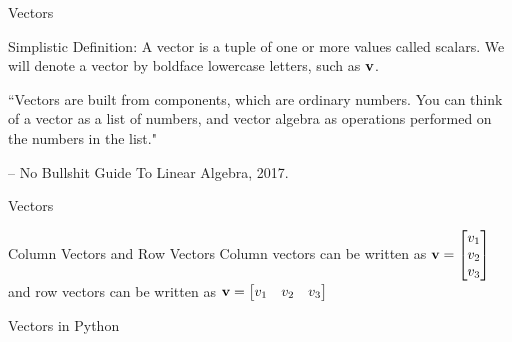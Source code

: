 \documentclass[aspectratio=169,xcolor=dvipsnames,svgnames,x11names,fleqn]{beamer}
\begin{document}
\begin{frame}{Vectors}


\begin{tblock}{Simplistic Definition:}
A vector is a tuple of one or more values called scalars.
We will denote a vector by boldface lowercase letters, such as ${\mathbf v}$.
\end{tblock}



\begin{tblock}
``Vectors are built from components, which are ordinary numbers. You can think of
a vector as a list of numbers, and vector algebra as operations performed on the
numbers in the list."

-- No Bullshit Guide To Linear Algebra, 2017.
\end{tblock}

\end{frame}

\begin{frame}{Vectors}
\begin{tblock}{Column Vectors and Row Vectors}
Column vectors can be written as ${\mathbf v} = \begin{bmatrix}
v_1\\
v_2\\
v_3
\end{bmatrix}$ and row vectors can be written as  ${\mathbf v} = \begin{bmatrix}
v_1 & v_2 & v_3
\end{bmatrix}$
\end{tblock}
\end{frame}

\begin{frame}[containsverbatim]{Vectors in Python}
\end{frame}
\end{document}
